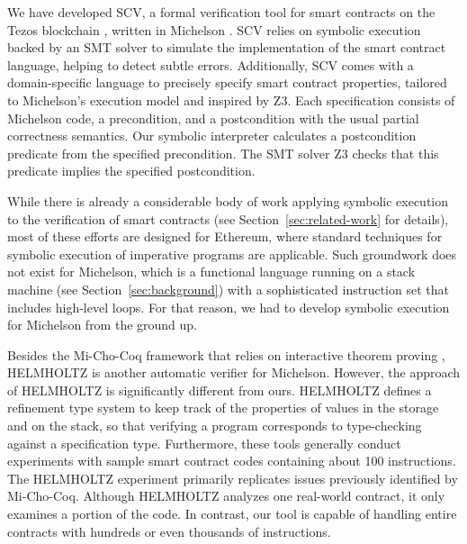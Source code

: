 \documentclass[runningheads]{llncs}
\begin{document}
We have developed SCV, a formal verification tool for smart contracts on the Tezos blockchain \cite{tezos-whitepaper}, written in Michelson \cite{michelson}. SCV relies on symbolic execution backed by an SMT solver to simulate the implementation of the smart contract language, helping to detect subtle errors. Additionally, SCV comes with a domain-specific language to precisely specify smart contract properties, tailored to Michelson's execution model and inspired by Z3. Each specification consists of Michelson code, a precondition, and a postcondition with the usual partial correctness semantics. Our symbolic interpreter calculates a postcondition predicate from the specified precondition. The SMT solver Z3 \cite{z3} checks that this predicate implies the specified postcondition.



While there is already a considerable body of work applying symbolic execution to the verification of smart contracts \cite{securify, manticore, kevm, park} (see Section~\ref{sec:related-work} for details), most of these efforts are designed for Ethereum, where standard techniques for symbolic execution of imperative programs are applicable. Such groundwork does not exist for Michelson, which is a functional language running on a stack machine (see Section~\ref{sec:background}) with a sophisticated instruction set that includes high-level loops. For that reason, we had to develop symbolic execution for Michelson from the ground up.

Besides the Mi-Cho-Coq framework that relies on interactive theorem proving \cite{micho}, HELMHOLTZ \cite{helmholtz} is another automatic verifier for Michelson. However, the approach of HELMHOLTZ is significantly different from ours. HELMHOLTZ defines a refinement type system to keep track of the properties of values in the storage and on the stack, so that verifying a program corresponds to type-checking against a specification type. Furthermore, these tools generally conduct experiments with sample smart contract codes containing about 100 instructions. The HELMHOLTZ experiment primarily replicates issues previously identified by Mi-Cho-Coq. Although HELMHOLTZ analyzes one real-world contract, it only examines a portion of the code. In contrast, our tool is capable of handling entire contracts with hundreds or even thousands of instructions.
\end{document}
